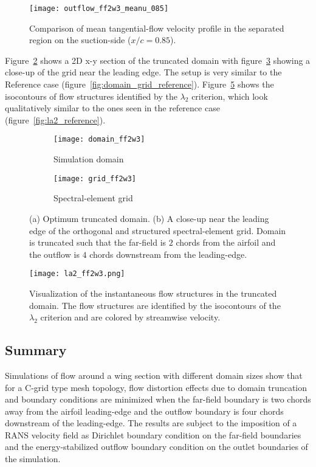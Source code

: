 \begin{figure}
	\centering
	\texttt{[image: outflow\_ff2w3\_meanu\_085]}
	\vspace{5pt}
	\caption{Comparison of mean tangential-flow velocity profile in the separated region on the suction-side ($x/c=0.85$).}
	\label{fig:outflow_ff2w3_meanu_sep}
\end{figure}
Figure~\ref{fig:domain_ff2w3} shows a 2D x-y section of the truncated domain with figure~\ref{fig:grid_ff2w3} showing a close-up of the grid near the leading edge. The setup is very similar to the Reference case (figure~\ref{fig:domain_grid_reference}). Figure~\ref{fig:la2_ff2w3} shows the isocontours of flow structures identified by the $\lambda_{2}$ criterion, which look qualitatively similar to the ones seen in the reference case (figure~\ref{fig:la2_reference}).
\begin{figure}[h]
	\centering
	\begin{subfigure}[b]{0.49\textwidth}
		\centering
		\texttt{[image: domain\_ff2w3]}
		\caption{Simulation domain}
		\label{fig:domain_ff2w3}
	\end{subfigure}
	\begin{subfigure}[b]{0.49\textwidth}
		\centering
		\texttt{[image: grid\_ff2w3]}
		\caption{Spectral-element grid}
		\label{fig:grid_ff2w3}
	\end{subfigure}
	\vspace{10pt}
	\caption{(a) Optimum truncated domain. (b) A close-up near the leading edge of the orthogonal and structured spectral-element grid. Domain is truncated such that the far-field is $2$ chords from the airfoil and the outflow is $4$ chords downstream from the leading-edge.}
	\label{fig:domain_grid_ff2w3}
\end{figure}

\begin{figure}
	\centering
	\texttt{[image: la2\_ff2w3.png]}
	\caption{Visualization of the instantaneous flow structures in the truncated domain. The flow structures are identified by the isocontours of the $\lambda_{2}$ criterion and are colored by streamwise velocity.}
	\label{fig:la2_ff2w3}
\end{figure}

\subsection{Summary}
Simulations of flow around a wing section with different domain sizes show that for a C-grid type mesh topology, flow distortion effects due to domain truncation and boundary conditions are minimized when the far-field boundary is two chords away from the airfoil leading-edge and the outflow boundary is four chords downstream of the leading-edge. The results are subject to the imposition of a RANS velocity field as Dirichlet boundary condition on the far-field boundaries and the energy-stabilized outflow boundary condition on the outlet boundaries of the simulation.

%
%
%
